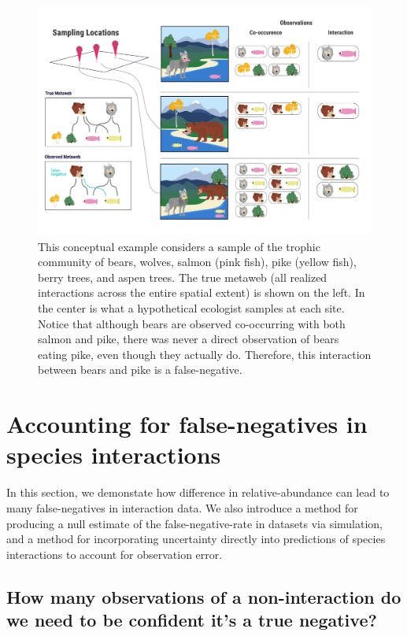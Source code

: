 \documentclass[11pt]{article}
\makeatletter
\def\maxwidth{\ifdim\Gin@nat@width>\linewidth\linewidth
\else\Gin@nat@width\fi}
\let\Oldincludegraphics\includegraphics
\renewcommand{\includegraphics}[1]{\Oldincludegraphics[width=\maxwidth]{#1}}
\makeatother
\begin{document}
\begin{figure}
\hypertarget{fig:concept}{%
\centering
\includegraphics{./figures/concept.png}
\caption{This conceptual example considers a sample of the trophic
community of bears, wolves, salmon (pink fish), pike (yellow fish),
berry trees, and aspen trees. The true metaweb (all realized
interactions across the entire spatial extent) is shown on the left. In
the center is what a hypothetical ecologist samples at each site. Notice
that although bears are observed co-occurring with both salmon and pike,
there was never a direct observation of bears eating pike, even though
they actually do. Therefore, this interaction between bears and pike is
a false-negative.}\label{fig:concept}
}
\end{figure}

\hypertarget{accounting-for-false-negatives-in-species-interactions}{%
\section{Accounting for false-negatives in species
interactions}\label{accounting-for-false-negatives-in-species-interactions}}

In this section, we demonstate how difference in relative-abundance can
lead to many false-negatives in interaction data. We also introduce a
method for producing a null estimate of the false-negative-rate in
datasets via simulation, and a method for incorporating uncertainty
directly into predictions of species interactions to account for
observation error.

\hypertarget{how-many-observations-of-a-non-interaction-do-we-need-to-be-confident-its-a-true-negative}{%
\subsection{How many observations of a non-interaction do we need to be
confident it's a true
negative?}\label{how-many-observations-of-a-non-interaction-do-we-need-to-be-confident-its-a-true-negative}}
\end{document}
